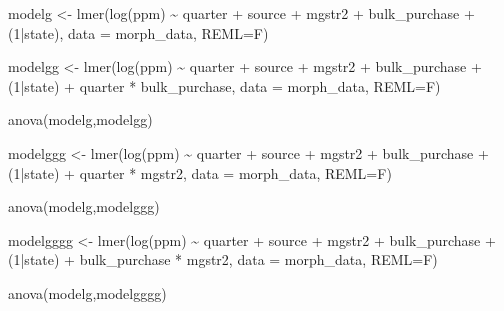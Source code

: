 \documentclass[
  11pt,
]{article}
\newenvironment{Shaded}{\begin{snugshade}}{\end{snugshade}}
\newcommand{\AttributeTok}[1]{\textcolor[rgb]{0.77,0.63,0.00}{#1}}
\newcommand{\DecValTok}[1]{\textcolor[rgb]{0.00,0.00,0.81}{#1}}
\newcommand{\FunctionTok}[1]{\textcolor[rgb]{0.00,0.00,0.00}{#1}}
\newcommand{\NormalTok}[1]{#1}
\newcommand{\OtherTok}[1]{\textcolor[rgb]{0.56,0.35,0.01}{#1}}
\newcommand{\SpecialCharTok}[1]{\textcolor[rgb]{0.00,0.00,0.00}{#1}}
\begin{document}
\begin{Shaded}
\begin{Highlighting}[]
\NormalTok{modelg }\OtherTok{\textless{}{-}} \FunctionTok{lmer}\NormalTok{(}\FunctionTok{log}\NormalTok{(ppm) }\SpecialCharTok{\textasciitilde{}}\NormalTok{  quarter }\SpecialCharTok{+}\NormalTok{ source }\SpecialCharTok{+}\NormalTok{ mgstr2 }\SpecialCharTok{+}\NormalTok{ bulk\_purchase }\SpecialCharTok{+}\NormalTok{ (}\DecValTok{1}\SpecialCharTok{|}\NormalTok{state), }\AttributeTok{data =}\NormalTok{ morph\_data, }\AttributeTok{REML=}\NormalTok{F)}


\NormalTok{modelgg }\OtherTok{\textless{}{-}} \FunctionTok{lmer}\NormalTok{(}\FunctionTok{log}\NormalTok{(ppm) }\SpecialCharTok{\textasciitilde{}}\NormalTok{  quarter }\SpecialCharTok{+}\NormalTok{ source }\SpecialCharTok{+}\NormalTok{ mgstr2 }\SpecialCharTok{+}\NormalTok{ bulk\_purchase }\SpecialCharTok{+}\NormalTok{ (}\DecValTok{1}\SpecialCharTok{|}\NormalTok{state) }\SpecialCharTok{+}
\NormalTok{                 quarter }\SpecialCharTok{*}\NormalTok{ bulk\_purchase, }\AttributeTok{data =}\NormalTok{ morph\_data, }\AttributeTok{REML=}\NormalTok{F)}

\FunctionTok{anova}\NormalTok{(modelg,modelgg)}

\NormalTok{modelggg }\OtherTok{\textless{}{-}} \FunctionTok{lmer}\NormalTok{(}\FunctionTok{log}\NormalTok{(ppm) }\SpecialCharTok{\textasciitilde{}}\NormalTok{  quarter }\SpecialCharTok{+}\NormalTok{ source }\SpecialCharTok{+}\NormalTok{ mgstr2 }\SpecialCharTok{+}\NormalTok{ bulk\_purchase }\SpecialCharTok{+}\NormalTok{ (}\DecValTok{1}\SpecialCharTok{|}\NormalTok{state) }\SpecialCharTok{+}
\NormalTok{                 quarter }\SpecialCharTok{*}\NormalTok{ mgstr2, }\AttributeTok{data =}\NormalTok{ morph\_data, }\AttributeTok{REML=}\NormalTok{F)}

\FunctionTok{anova}\NormalTok{(modelg,modelggg)}

\NormalTok{modelgggg }\OtherTok{\textless{}{-}} \FunctionTok{lmer}\NormalTok{(}\FunctionTok{log}\NormalTok{(ppm) }\SpecialCharTok{\textasciitilde{}}\NormalTok{  quarter }\SpecialCharTok{+}\NormalTok{ source }\SpecialCharTok{+}\NormalTok{ mgstr2 }\SpecialCharTok{+}\NormalTok{ bulk\_purchase }\SpecialCharTok{+}\NormalTok{ (}\DecValTok{1}\SpecialCharTok{|}\NormalTok{state) }\SpecialCharTok{+}
\NormalTok{                 bulk\_purchase }\SpecialCharTok{*}\NormalTok{ mgstr2, }\AttributeTok{data =}\NormalTok{ morph\_data, }\AttributeTok{REML=}\NormalTok{F)}

\FunctionTok{anova}\NormalTok{(modelg,modelgggg)}


\end{Highlighting}
\end{Shaded}
\end{document}
